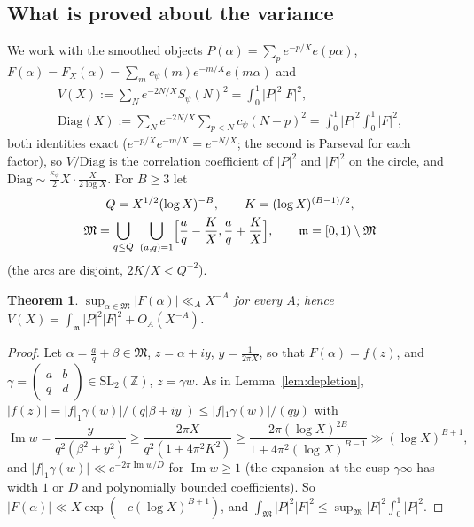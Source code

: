 ﻿\documentclass[11pt]{amsart}
\newtheorem{theorem}{Theorem}[section]
\theoremstyle{remark}
\newcommand{\Z}{\mathbb Z}
\begin{document}
\subsection{What is proved about the variance}\label{subsec:reduction}
We work with the smoothed objects $P(\alpha)=\sum_pe^{-p/X}e(p\alpha)$, $F(\alpha)=F_X(\alpha)=\sum_mc_\psi(m)e^{-m/X}e(m\alpha)$ and
\begin{gather*}
V(X):=\sum_Ne^{-2N/X}S_\psi(N)^2=\int_0^1|P|^2|F|^2,\\
\mathrm{Diag}(X):=\sum_Ne^{-2N/X}\sum_{p<N}c_\psi(N-p)^2=\int_0^1|P|^2\int_0^1|F|^2,
\end{gather*}
both identities exact ($e^{-p/X}e^{-m/X}=e^{-N/X}$; the second is Parseval for each factor), so $V/\mathrm{Diag}$ is the correlation coefficient of $|P|^2$ and $|F|^2$ on the circle, and $\mathrm{Diag}\sim\frac{\kappa_\psi}2X\cdot\frac X{2\log X}$. For $B\ge3$ let
\begin{gather*}
Q=X^{1/2}(\log X)^{-B},\qquad K=(\log X)^{(B-1)/2},\\
\mathfrak M=\bigcup_{q\le Q}\ \bigcup_{(a,q)=1}\Bigl[\frac aq-\frac KX,\frac aq+\frac KX\Bigr],\qquad \mathfrak m=[0,1)\setminus\mathfrak M
\end{gather*}
(the arcs are disjoint, $2K/X<Q^{-2}$).

\begin{theorem}\label{thm:reduction}
$\sup_{\alpha\in\mathfrak M}|F(\alpha)|\ll_{A}X^{-A}$ for every $A$; hence $V(X)=\int_{\mathfrak m}|P|^2|F|^2+O_A(X^{-A})$.
\end{theorem}
\begin{proof}
Let $\alpha=\frac aq+\beta\in\mathfrak M$, $z=\alpha+iy$, $y=\frac1{2\pi X}$, so that $F(\alpha)=f(z)$, and $\gamma=\left(\begin{smallmatrix}a&b\\q&d\end{smallmatrix}\right)\in\mathrm{SL}_2(\Z)$, $z=\gamma w$. As in Lemma~\ref{lem:depletion}, $|f(z)|=|f|_1\gamma(w)|/(q|\beta+iy|)\le|f|_1\gamma(w)|/(qy)$ with
\[
\operatorname{Im}w=\frac{y}{q^2(\beta^2+y^2)}\ge\frac{2\pi X}{q^2(1+4\pi^2K^2)}\ge\frac{2\pi(\log X)^{2B}}{1+4\pi^2(\log X)^{B-1}}\gg(\log X)^{B+1},
\]
and $|f|_1\gamma(w)|\ll e^{-2\pi\operatorname{Im}w/D}$ for $\operatorname{Im}w\ge1$ (the expansion at the cusp $\gamma\infty$ has width $1$ or $D$ and polynomially bounded coefficients). So $|F(\alpha)|\ll X\exp(-c(\log X)^{B+1})$, and $\int_{\mathfrak M}|P|^2|F|^2\le\sup_{\mathfrak M}|F|^2\int_0^1|P|^2$.
\end{proof}
\end{document}
